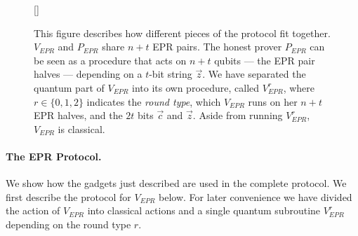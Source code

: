 \begin{figure}[t]
[\FBwidth]
{
  
}
{\caption{This figure describes how different pieces of the protocol fit together. $V_{EPR}$ and $P_{EPR}$ share $n+t$ EPR pairs. The honest prover $P_{EPR}$ can be seen as a procedure that acts on $n+t$ qubits --- the EPR pair halves --- depending on a $t$-bit string $\vec{z}$.  We have separated the quantum part of $V_{EPR}$ into its own procedure, called $V_{EPR}^{r}$, where $r\in\{0,1,2\}$ indicates the \emph{round type}, which $V_{EPR}$ runs on her $n+t$ EPR halves, and the $2t$ bits $\vec{c}$ and $\vec{z}$. Aside from running $V_{EPR}^r$, $V_{EPR}$ is classical. }\label{fig:EPR-high-level}}
\end{figure}



\paragraph{The EPR Protocol.} We show how the gadgets just described are used in the complete protocol. We first describe the protocol for $V_{EPR}$ below.  For later convenience we have divided the action of $V_{EPR}$ into classical actions and a single quantum subroutine $V_{EPR}^r$ depending on the round type $r$. 

